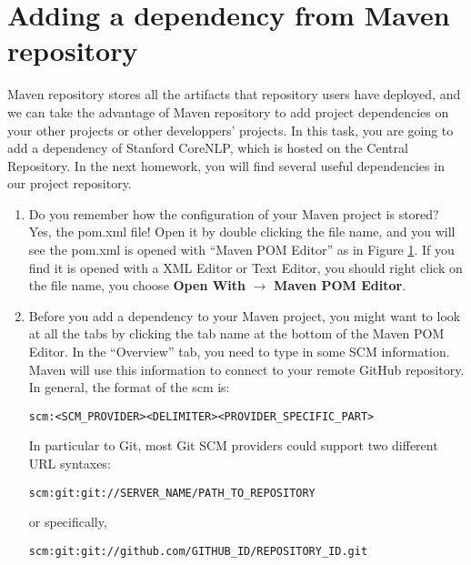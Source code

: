 
\section{Adding a dependency from Maven repository}

Maven repository stores all the artifacts that repository users have deployed, and we can take the advantage of Maven repository to add project dependencies on your other projects or other developpers' projects. In this task, you are going to add a dependency of Stanford CoreNLP, which is hosted on the Central Repository. In the next homework, you will find several useful dependencies in our project repository.

\begin{enumerate}
 
\begin{figure}[t]
\centering
\texttt{[image: repo-01-pom]}
\caption{Opening a POM file\label{repo-01-pom}}
\end{figure}

\item Do you remember how the configuration of your Maven project is stored? Yes, the pom.xml file! Open it by double clicking the file name, and you will see the pom.xml is opened with ``Maven POM Editor'' as in Figure \ref{repo-01-pom}. If you find it is opened with a XML Editor or Text Editor, you should right click on the file name, you choose \textbf{Open With} $\rightarrow$ \textbf{Maven POM Editor}.
\item Before you add a dependency to your Maven project, you might want to look at all the tabs by clicking the tab name at the bottom of the Maven POM Editor. In the ``Overview'' tab, you need to type in some SCM information. Maven will use this information to connect to your remote GitHub repository. In general, the format of the scm is:

\begin{verbatim}
scm:<SCM_PROVIDER><DELIMITER><PROVIDER_SPECIFIC_PART>
\end{verbatim}

In particular to Git, most Git SCM providers could support two different URL syntaxes:

\begin{verbatim}
scm:git:git://SERVER_NAME/PATH_TO_REPOSITORY
\end{verbatim}

or specifically, 

\begin{verbatim}
scm:git:git://github.com/GITHUB_ID/REPOSITORY_ID.git
\end{verbatim}


\end{enumerate}
